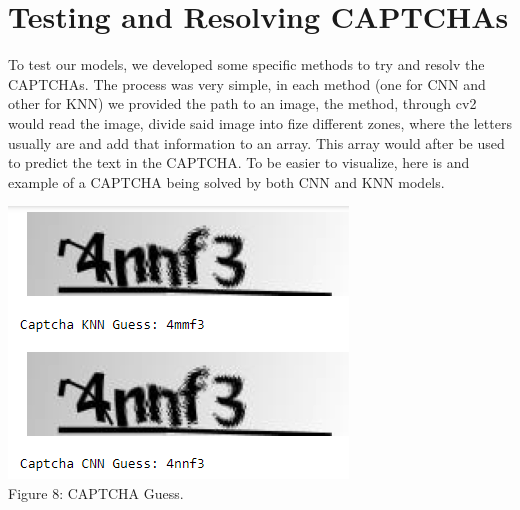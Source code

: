 \documentclass[conference]{IEEEtran}
\begin{document}
\section{Testing and Resolving CAPTCHAs}
To test our models, we developed some specific methods to try and resolv the CAPTCHAs. The process was very simple, in each method (one for CNN and other for KNN) we provided the path to an image, the method, through cv2 would read the image, divide said image into fize different zones, where the letters usually are and add that information to an array. This array would after be used to predict the text in the CAPTCHA. To be easier to visualize, here is and example of a CAPTCHA being solved by both CNN and KNN models.  
\begin{center}
\includegraphics[scale=0.55]{captchasolved.png} \\
\caption{Figure 8: CAPTCHA Guess.}
\end{center}
\\ \\ \\
\end{document}

